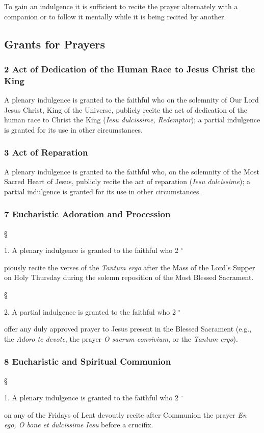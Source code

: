 \documentclass[12pt]{article}
\newif\ifxetexorluatex
\newcommand{\emphasis}[1]{\emph{#1}}
\newcommand{\emphasis}[1]{\textsl{#1}}
\newcommand{\foreign}[1]{\emphasis{#1}}
\newcommand{\sectionsign}{%
	\ifxetexorluatex%
		{\setmainfont{Times New Roman}§}%
	\else%
		§
	\fi
}
\newcommand{\degreesign}{%
	\ifxetexorluatex%
		{\setmainfont{Arial}°}%
	\else%
		$^\circ$
	\fi
}
\begin{document}
 To gain an indulgence it is sufficient to recite the prayer alternately with a companion or to follow it mentally while it is being recited by another.

\subsection{Grants for Prayers}
\newcommand{\grant}[2]{\subsubsection*{#1 #2}}
\newcommand{\subgrant}[1]{\sectionsign{}#1.}
\newcommand{\subsubgrant}[1]{#1\degreesign{}}
\hypertarget{grant2}{\grant{2}{Act of Dedication of the Human Race to Jesus Christ the King}}
A plenary indulgence is granted to the faithful who on the solemnity of Our Lord Jesus Christ, King of the Universe, publicly recite the act of dedication of the human race to Christ the King (\foreign{Iesu dulcissime, Redemptor});
a partial indulgence is granted for its use in other circumstances.

\hypertarget{grant3}{\grant{3}{Act of Reparation}}
A plenary indulgence is granted to the faithful who, on the solemnity of the Most Sacred Heart of Jesus, publicly recite the act of reparation (\foreign{Iesu dulcissime}); a partial indulgence is granted for its use in other circumstances.

\hypertarget{grant7}{\grant{7}{Eucharistic Adoration and Procession}}
\subgrant{1} A plenary indulgence is granted to the faithful who \subsubgrant{2} piously recite the verses of the \foreign{Tantum ergo} after the Mass of the Lord's Supper on Holy Thursday during the solemn reposition of the Most Blessed Sacrament.

\subgrant{2} A partial indulgence is granted to the faithful who \subsubgrant{2} offer any duly approved prayer to Jesus present in the Blessed Sacrament (e.g., the \foreign{Adoro te devote}, the prayer \foreign{O sacrum convivium}, or the \foreign{Tantum ergo}).

\hypertarget{grant8}{\grant{8}{Eucharistic and Spiritual Communion}}

\subgrant{1} A plenary indulgence is granted to the faithful who \subsubgrant{2} on any of the Fridays of Lent devoutly recite after Communion the prayer \foreign{En ego, O bone et dulcissime Iesu} before a crucifix.
\end{document}
